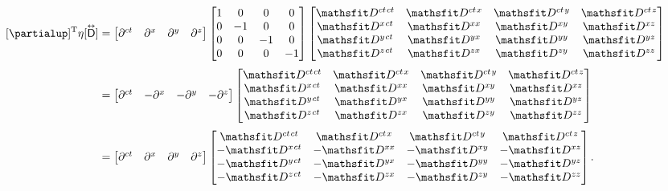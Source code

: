 \documentclass[12pt]{article}
\newcommand{\capdy}[1]{ \overset{ \text{\tiny$\bm\leftrightarrow$} }{\vphantom{\text{\small{A}}}\smash{#1}} }
\begin{document}
\begin{equation*}
\begin{aligned}
\mkern0mu [\partialup]^{\mathrm{T}} \eta [\capdy{\mathsf{D}}]
&=
\begin{bmatrix}
\partial^{ct} & \partial^x & \partial^y & \partial^z
\end{bmatrix}
\begin{bmatrix}
1 & 0 & 0 & 0 \\
0 & -1 & 0 & 0 \\
0 & 0 & -1 & 0 \\
0 & 0 & 0 & -1
\end{bmatrix}
\begin{bmatrix}
\mathsfit D^{ct \mkern1.5mu ct} & \mathsfit D^{ct \mkern1.5mu x} & \mathsfit D^{ct \mkern1.5mu y} & \mathsfit D^{ct \mkern1.5mu z} \\
\mathsfit D^{x \mkern1.5mu ct} & \mathsfit D^{x x} & \mathsfit D^{x y} & \mathsfit D^{x z}  \\
\mathsfit D^{y \mkern1.5mu ct} & \mathsfit D^{y x} & \mathsfit D^{y y} & \mathsfit D^{y z}  \\
\mathsfit D^{z \mkern1.5mu ct} & \mathsfit D^{z x} & \mathsfit D^{z y} & \mathsfit D^{z z} 
\end{bmatrix}
\\[3pt]
&=
\begin{bmatrix}
\partial^{ct} & - \partial^x & - \partial^y & -\partial^z
\end{bmatrix}
\begin{bmatrix}
\mathsfit D^{ct \mkern1.5mu ct} & \mathsfit D^{ct \mkern1.5mu x} & \mathsfit D^{ct \mkern1.5mu y} & \mathsfit D^{ct \mkern1.5mu z} \\
\mathsfit D^{x \mkern1.5mu ct} & \mathsfit D^{x x} & \mathsfit D^{x y} & \mathsfit D^{x z}  \\
\mathsfit D^{y \mkern1.5mu ct} & \mathsfit D^{y x} & \mathsfit D^{y y} & \mathsfit D^{y z}  \\
\mathsfit D^{z \mkern1.5mu ct} & \mathsfit D^{z x} & \mathsfit D^{z y} & \mathsfit D^{z z} 
\end{bmatrix}
\\[3pt]
&=
\begin{bmatrix}
\partial^{ct} & \partial^x & \partial^y & \partial^z
\end{bmatrix}
\begin{bmatrix}
\mathsfit D^{ct \mkern1.5mu ct} & \mathsfit D^{ct \mkern1.5mu x} & \mathsfit D^{ct \mkern1.5mu y} & \mathsfit D^{ct \mkern1.5mu z} \\
- \mathsfit D^{x \mkern1.5mu ct} & - \mathsfit D^{x x} & - \mathsfit D^{x y} & - \mathsfit D^{x z}  \\
- \mathsfit D^{y \mkern1.5mu ct} & - \mathsfit D^{y x} & - \mathsfit D^{y y} & - \mathsfit D^{y z}  \\
- \mathsfit D^{z \mkern1.5mu ct} & - \mathsfit D^{z x} & - \mathsfit D^{z y} & - \mathsfit D^{z z} 
\end{bmatrix}.
\end{aligned}
\end{equation*}
\end{document}
